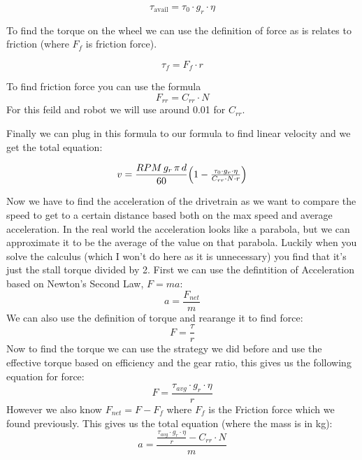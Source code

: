 \documentclass[11pt]{article}
\begin{document}
\[
  \tau_{\mathrm{avail}} = \tau_{0} \cdot g_r \cdot \eta
\]

To find the torque on the wheel we can use the definition of force as is relates to friction (where \(F_{f}\) is friction force).

\[
  \tau_{f} = F_{f} \cdot r
\]

To find friction force you can use the formula
\[
  F_{rr} = C_{rr} \cdot N
\]
For this feild and robot we will use around 0.01 for \(C_{rr}\).

Finally we can plug in this formula to our formula to find linear velocity and we get the total equation:

\[
  v = \frac{RPM\,g_r\,\pi\,d}{60}\Bigl(1 - \tfrac{\tau_{0} \cdot g_r \cdot \eta}{C_{rr} \cdot N \cdot r}\Bigr)
\]

Now we have to find the acceleration of the drivetrain as we want to compare the speed to get to a certain distance based both on the max speed and average acceleration. In the real world the acceleration looks like a parabola, but we can approximate it to be the average of the value on that parabola. Luckily when you solve the calculus (which I won't do here as it is unnecessary) you find that it's just the stall torque divided by 2. First we can use the defintition of Acceleration based on Newton's Second Law, \(F = ma\):
\[
  a = \frac{F_{net}}{m}
\]
We can also use the definition of torque and rearange it to find force:
\[
  F = \frac{\tau}{r}
\]
Now to find the torque we can use the strategy we did before and use the effective torque based on efficiency and the gear ratio, this gives us the following equation for force:
\[
  F = \frac{\tau_{avg} \cdot g_r \cdot \eta}{r}
\]
However we also know \(F_{net} = F - F_f\) where \(F_f\) is the Friction force which we found previously. This gives us the total equation (where the mass is in kg):
\[
  a = \frac{\frac{\tau_{avg} \cdot g_r \cdot \eta}{r} - C_{rr} \cdot N}{m}
\]
\end{document}

